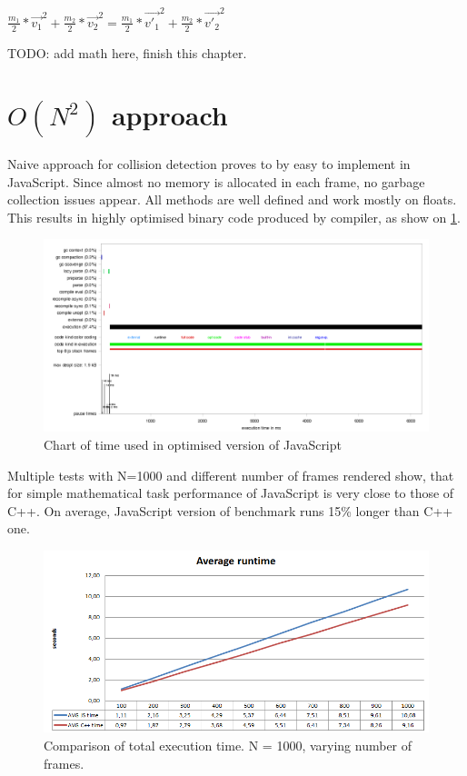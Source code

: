 $\frac{m_1}{2}*\vec{v_1}^2 + \frac{m_2}{2}*\vec{v_2}^2 = \frac{m_1}{2}*\vec{v'_1}^2 + \frac{m_2}{2}*\vec{v'_2}^2$

TODO: add math here, finish this chapter.

\section{{$O(N^2)$} approach}
\label{sec:sphereinitial}

Naive approach for collision detection proves to by easy to implement in JavaScript. Since almost no memory is allocated in each frame, no garbage collection issues appear. All methods are well defined and work mostly on floats. This results in highly optimised binary code produced by compiler, as show on \ref{img:spheres1profile}.

\begin{figure}[h!]
  \caption{Chart of time used in optimised version of JavaScript}
  \label{img:spheres1profile}
  \centering
	\includegraphics[width=16cm]{spheres/spheres1-profile.png}
\end{figure} 

Multiple tests with N=1000 and different number of frames rendered show, that for simple mathematical task performance of JavaScript is very close to those of C++. On average, JavaScript version of benchmark runs 15\% longer than C++ one.

\begin{figure}[h!]
  \caption{Comparison of total execution time. N = 1000, varying number of frames.}
  \label{img:spheres1-time-total}
  \centering
	\includegraphics[width=16cm]{spheres/time-total.png}
\end{figure} 


